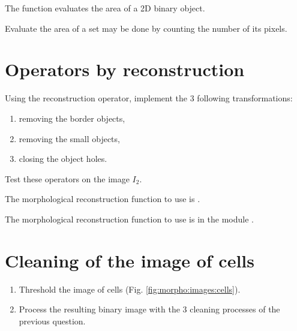 \begin{mcomment}

\begin{mremark}
The function  evaluates the area of a 2D binary object.
\end{mremark} 
\end{mcomment}

\begin{pcomment}
 \begin{premark}
  Evaluate the area of a set may be done  by counting the number of its pixels.
 \end{premark}

\end{pcomment}



\section{Operators by reconstruction}
\begin{qbox}
Using the reconstruction operator, implement the 3 following transformations:
\begin{enumerate}
   \item removing the border objects,
	\item removing the small objects,
	\item closing the object holes.
\end{enumerate}
Test these operators on the image $I_2$.
\end{qbox}

\begin{mcomment}
\begin{mremark}
The morphological reconstruction function to use is .
\end{mremark}
\end{mcomment}

\begin{pcomment}
\begin{premark}
The morphological reconstruction function to use is 
 in the module .
\end{premark}
\end{pcomment}


\section{Cleaning of the image of cells}
\begin{qbox}
\begin{enumerate}
\item Threshold the image of cells (Fig. \ref{fig:morpho:images:cells}).
\item Process the resulting binary image with the 3 cleaning processes of the previous question.
\end{enumerate}
\end{qbox}

